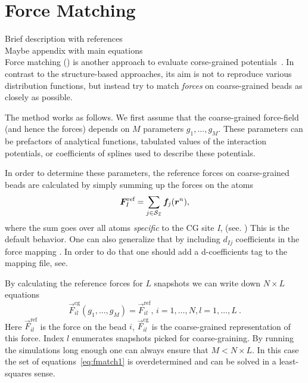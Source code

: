 \section{Force Matching}
\sasha

Brief description with references \\
Maybe appendix with main equations \\

Force matching (\fm) is another approach to evaluate corse-grained potentials~\cite{Ercolessi:1994,Izvekov:2005,Noid:2007}. In contrast to the structure-based approaches, its aim is not to reproduce various distribution functions, but instead try to match {\em forces} on coarse-grained beads as closely as possible.

The method works as follows. We first assume that the coarse-grained force-field (and hence the forces) depends on $M$ parameters $g_1,...,g_M $. These parameters can be prefactors of analytical functions, tabulated values of the interaction potentials, or coefficients of splines used to describe these potentials.

In order to determine these parameters, the reference forces on coarse-grained beads are calculated by simply summing up the forces on the atoms
\begin{equation}
  {\vec F}_I^\text{ref} = \sum_{j \in {\cal S_I}} {\vec f}_j({\vec r^n}),
  \label{eq:force_mapping}
\end{equation}
where the sum goes over all atoms {\it specific} to the CG site {\it I}, (see. )
This is the default behavior. One can also generalize that by including $d_{Ij}$ coefficients in the force mapping \cite{Noid:2008.1}. In order to do that one should add a d-coefficients tag to the mapping file, see. 

By calculating the reference forces for $L$ snapshots we can write down $N \times L$ equations
%
\begin{equation}
  {\vec F}_{il}^\text{cg}(g_1,...,g_M)=\vec F_{il}^\text{ref},\, i=1,\dots,N, l=1,\dots,L~.
  \label{eq:fmatch1}
\end{equation}
%
Here ${\vec F}_{il}^\text{ref}$ is the force on the bead $i$, ${\vec F}_{il}^\text{cg} $ is the coarse-grained representation of this force. Index $l$ enumerates snapshots picked for coarse-graining. By running the simulations long enough one can always ensure that $M < N \times L$. In this case the set of equations~\ref{eq:fmatch1} is overdetermined and can be solved in a least-squares sense.

